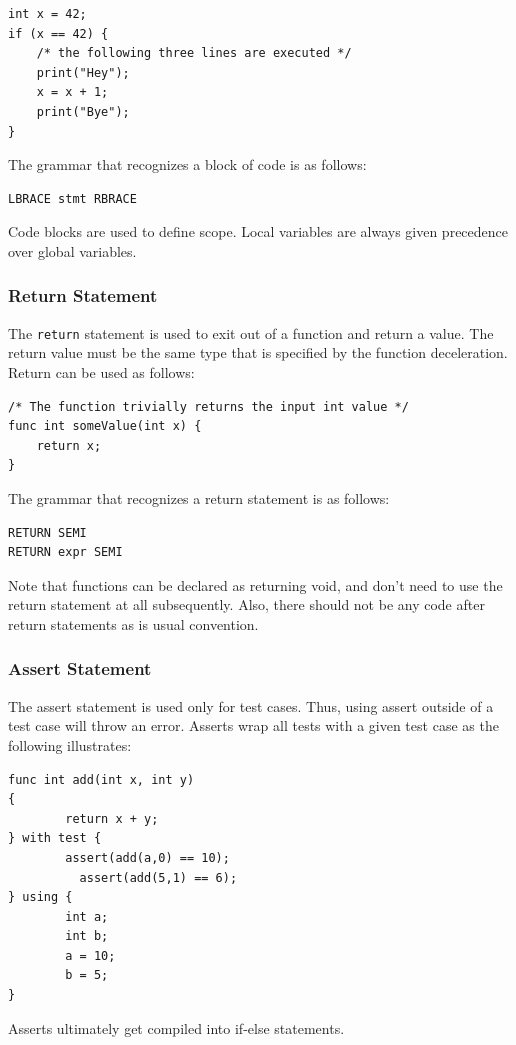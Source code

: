 \documentclass{article}
\begin{document}
\begin{lstlisting}
int x = 42;
if (x == 42) {
	/* the following three lines are executed */
	print("Hey");
	x = x + 1;
	print("Bye");
}
\end{lstlisting}

The grammar that recognizes a block of code is as follows:
\begin{Verbatim}[frame=single]
LBRACE stmt RBRACE
\end{Verbatim}

Code blocks are used to define scope. Local variables are always given precedence over global variables. 

\subsubsection{Return Statement}
The \texttt{return} statement is used to exit out of a function and return a value.  The return value must be the same type that is specified by the function deceleration.  Return can be used as follows:

\begin{lstlisting}
/* The function trivially returns the input int value */
func int someValue(int x) {
	return x;
}
\end{lstlisting}

The grammar that recognizes a return statement is as follows:
\begin{Verbatim}[frame=single]
RETURN SEMI
RETURN expr SEMI
\end{Verbatim}

Note that functions can be declared as returning void, and don't need to use the return statement at all subsequently. Also, there should not be any code after return statements as is usual convention.

\subsubsection{Assert Statement}
The assert statement is used only for test cases. Thus, using assert outside of a test case will throw an error. Asserts wrap all tests with a given test case as the following illustrates:

\begin{lstlisting}
func int add(int x, int y)
{
        return x + y;
} with test {
        assert(add(a,0) == 10);
          assert(add(5,1) == 6);
} using {
        int a;
        int b;
        a = 10;
        b = 5;
}
\end{lstlisting}
Asserts ultimately get compiled into if-else statements. 
\end{document}
